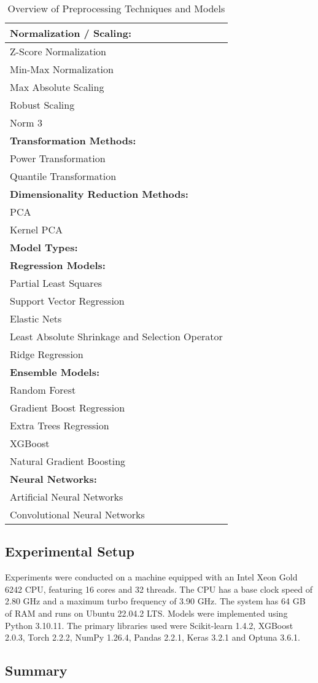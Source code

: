 \begin{table}[ht]
\centering
\begin{tabularx}{\columnwidth}{>{\raggedright\arraybackslash}X}
\toprule
\textbf{Normalization / Scaling:} \\
\midrule
Z-Score Normalization \\
Min-Max Normalization \\
Max Absolute Scaling \\
Robust Scaling \\
Norm 3 \\
\midrule
\textbf{Transformation Methods:} \\
\midrule
Power Transformation \\
Quantile Transformation \\
\midrule
\textbf{Dimensionality Reduction Methods:} \\
\midrule
PCA \\
Kernel PCA \\
\midrule
\textbf{Model Types:} \\
\midrule
\textbf{Regression Models:} \\
\quad Partial Least Squares \\
\quad Support Vector Regression \\
\quad Elastic Nets \\
\quad Least Absolute Shrinkage and Selection Operator \\
\quad Ridge Regression \\
\textbf{Ensemble Models:} \\
\quad Random Forest \\
\quad Gradient Boost Regression \\
\quad Extra Trees Regression \\
\quad XGBoost \\
\quad Natural Gradient Boosting \\
\textbf{Neural Networks:} \\
\quad Artificial Neural Networks \\
\quad Convolutional Neural Networks \\\bottomrule
\end{tabularx}
\caption{Overview of Preprocessing Techniques and Models}
\label{tab:preprocessing-models}
\end{table}


\subsection{Experimental Setup}
Experiments were conducted on a machine equipped with an Intel Xeon Gold 6242 CPU, featuring 16 cores and 32 threads.
The CPU has a base clock speed of 2.80 GHz and a maximum turbo frequency of 3.90 GHz.
The system has 64 GB of RAM and runs on Ubuntu 22.04.2 LTS.
Models were implemented using Python 3.10.11.
The primary libraries used were Scikit-learn 1.4.2, XGBoost 2.0.3, Torch 2.2.2, NumPy 1.26.4, Pandas 2.2.1, Keras 3.2.1 and Optuna 3.6.1.




\subsection{Summary}
